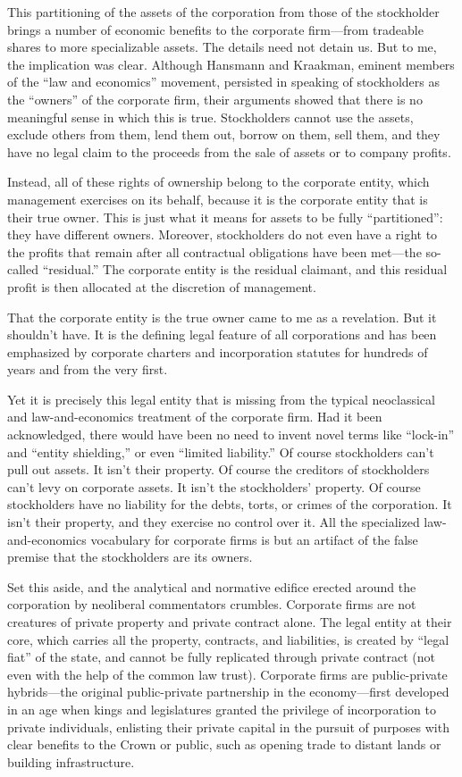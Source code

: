 \documentclass[
]{book}
\begin{document}
This partitioning of the assets of the corporation from those of the stockholder brings a number of economic benefits to the corporate firm---from tradeable shares to more specializable assets. The details need not detain us. But to me, the implication was clear. Although Hansmann and Kraakman, eminent members of the ``law and economics'' movement, persisted in speaking of stockholders as the ``owners'' of the corporate firm, their arguments showed that there is no meaningful sense in which this is true. Stockholders cannot use the assets, exclude others from them, lend them out, borrow on them, sell them, and they have no legal claim to the proceeds from the sale of assets or to company profits.

Instead, all of these rights of ownership belong to the corporate entity, which management exercises on its behalf, because it is the corporate entity that is their true owner. This is just what it means for assets to be fully ``partitioned'': they have different owners. Moreover, stockholders do not even have a right to the profits that remain after all contractual obligations have been met---the so-called ``residual.'' The corporate entity is the residual claimant, and this residual profit is then allocated at the discretion of management.

That the corporate entity is the true owner came to me as a revelation. But it shouldn't have. It is the defining legal feature of all corporations and has been emphasized by corporate charters and incorporation statutes for hundreds of years and from the very first.

Yet it is precisely this legal entity that is missing from the typical neoclassical and law-and-economics treatment of the corporate firm. Had it been acknowledged, there would have been no need to invent novel terms like ``lock-in'' and ``entity shielding,'' or even ``limited liability.'' Of course stockholders can't pull out assets. It isn't their property. Of course the creditors of stockholders can't levy on corporate assets. It isn't the stockholders' property. Of course stockholders have no liability for the debts, torts, or crimes of the corporation. It isn't their property, and they exercise no control over it. All the specialized law-and-economics vocabulary for corporate firms is but an artifact of the false premise that the stockholders are its owners.

Set this aside, and the analytical and normative edifice erected around the corporation by neoliberal commentators crumbles. Corporate firms are not creatures of private property and private contract alone. The legal entity at their core, which carries all the property, contracts, and liabilities, is created by ``legal fiat'' of the state, and cannot be fully replicated through private contract (not even with the help of the common law trust). Corporate firms are public-private hybrids---the original public-private partnership in the economy---first developed in an age when kings and legislatures granted the privilege of incorporation to private individuals, enlisting their private capital in the pursuit of purposes with clear benefits to the Crown or public, such as opening trade to distant lands or building infrastructure.
\end{document}
